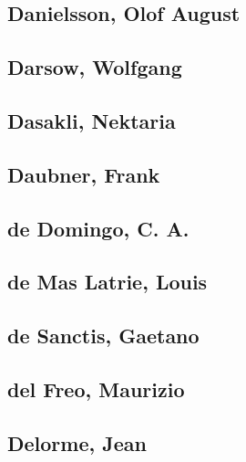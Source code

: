 \subsection[Danielsson, Olof August (1)]{Danielsson, Olof August}

\subsection[Darsow, Wolfgang (1)]{Darsow, Wolfgang}

\subsection[Dasakli, Nektaria (1)]{Dasakli, Nektaria}

\subsection[Daubner, Frank (1)]{Daubner, Frank}

\subsection[de Domingo, C. A. (1)]{de Domingo, C. A.}

\subsection[de Mas Latrie, Louis (1)]{de Mas Latrie, Louis}

\subsection[de Sanctis, Gaetano (2)]{de Sanctis, Gaetano}


\subsection[del Freo, Maurizio (1)]{del Freo, Maurizio}

\subsection[Delorme, Jean (1)]{Delorme, Jean}

